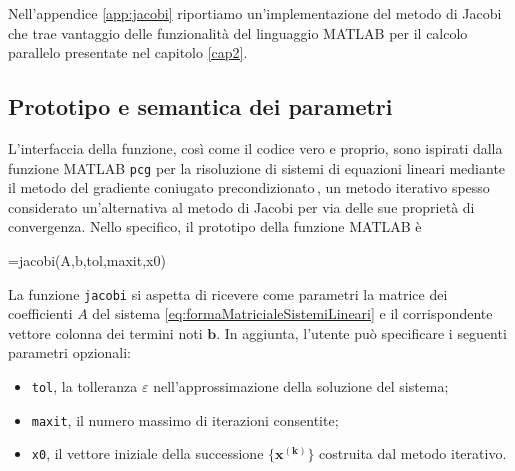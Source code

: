 Nell'appendice \ref{app:jacobi} riportiamo un'implementazione del metodo di Jacobi che trae vantaggio delle funzionalit\`a del linguaggio MATLAB per il 
calcolo parallelo presentate nel capitolo \ref{cap2}.

\subsection{Prototipo e semantica dei parametri}
L'interfaccia della funzione, cos\`i come il codice vero e proprio, sono ispirati dalla funzione MATLAB 
\lstinline|pcg| per la risoluzione di sistemi di equazioni lineari mediante il metodo del gradiente coniugato precondizionato\,\cite{MathWorksPCG}, 
un metodo iterativo spesso considerato un'alternativa al metodo di Jacobi per via delle sue propriet\`a di convergenza.
Nello specifico, il prototipo della funzione MATLAB \`e
\begin{matlabcode}
=jacobi(A,b,tol,maxit,x0)
\end{matlabcode}
La funzione \lstinline|jacobi| si aspetta di ricevere come parametri la matrice dei coefficienti $A$ del sistema \eqref{eq:formaMatricialeSistemiLineari} e il corrispondente vettore colonna dei termini noti $\mathbf{b}$.\newline
In aggiunta, l'utente pu\`o specificare i seguenti parametri opzionali:
\begin{itemize}
    \item \lstinline|tol|, la tolleranza $\varepsilon$ nell'approssimazione della soluzione del sistema;
    \item \lstinline|maxit|, il numero massimo di iterazioni consentite;
    \item \lstinline|x0|, il vettore iniziale della successione $\mathbf{\{x^{(k)}\}}$ costruita dal metodo iterativo.
\end{itemize}

